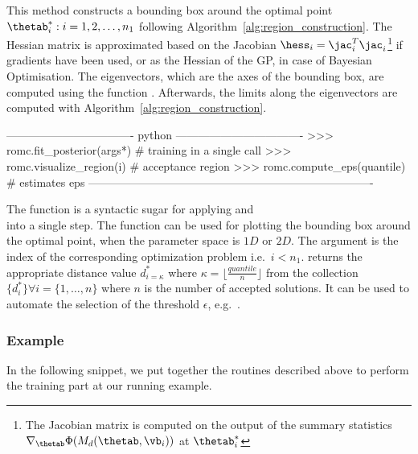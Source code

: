 \noindent
This method constructs a bounding box around the optimal point
$\thetab_i^* : i = 1, 2, \ldots, n_1$ following
Algorithm~\ref{alg:region_construction}. The Hessian matrix is
approximated based on the Jacobian
$\hess_i = \jac_i^T \jac_i$\footnote{The Jacobian matrix is computed
  on the output of the summary statistics
  $\nabla_{\thetab} \Phi(M_d(\thetab, \vb_i))$ at $\thetab_i^*$} if
gradients have been used, or as the Hessian of the GP, in case of
Bayesian Optimisation. The eigenvectors, which are the axes of the
bounding box, are computed using the function
. Afterwards, the limits along the
eigenvectors are computed with
Algorithm~\ref{alg:region_construction}.

\begin{Code}
---------------------------------- python ----------------------------------
>>> romc.fit_posterior(args*)  # training in a single call
>>> romc.visualize_region(i)   # acceptance region
>>> romc.compute_eps(quantile) # estimates eps
----------------------------------------------------------------------------
\end{Code}

\noindent
The function  is a syntactic sugar for applying
 and \\  into a single
step. The function  can be used for plotting
the bounding box around the optimal point, when the parameter space is
$1D$ or $2D$. The argument  is the index of the corresponding
optimization problem i.e.\ $i<n_1$.  returns the
appropriate distance value $d_{i=\kappa}^*$ where
$\kappa = \lfloor \frac{quantile}{n} \rfloor$ from the collection
$\{ d_i^* \} \forall i = \{1, \ldots, n\}$ where $n$ is the number of
accepted solutions. It can be used to automate the selection of the
threshold $\epsilon$, e.g.\ .


\subsubsection*{Example}


In the following snippet, we put together the routines described above
to perform the training part at our running example.


